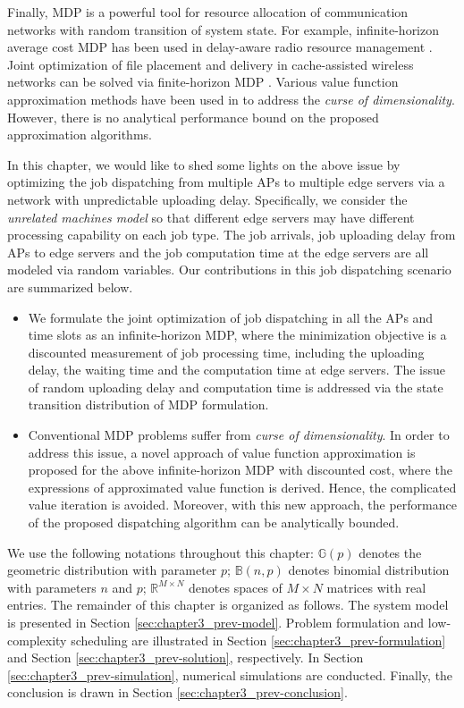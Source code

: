 Finally, MDP is a powerful tool for resource allocation of communication networks with random transition of system state. For example,  
infinite-horizon average cost MDP has been used in delay-aware radio resource management \cite{Ruiwang2011,Cui2012,Ruiwang2013}. Joint optimization of file placement and delivery in cache-assisted wireless networks can be solved via finite-horizon MDP \cite{Lv2018-icc,Lv2018-gc,Lv2019}. Various value function approximation methods have been used in \cite{Ruiwang2011,Cui2012,Ruiwang2013,Lv2018-icc,Lv2018-gc,Lv2019} 
to address the \emph{curse of dimensionality}. However, there is no analytical performance bound on the proposed approximation algorithms.

In this chapter, we would like to shed some lights on the above issue by optimizing the job dispatching from multiple APs to multiple edge servers via a network with unpredictable uploading delay.
Specifically, we consider the \emph{unrelated machines model} so that different edge servers may have different processing capability on each job type. 
The job arrivals, job uploading delay from APs to edge servers and the job computation time at the edge servers are all modeled via random variables.
Our contributions in this job dispatching scenario are summarized below.
\begin{itemize}
    \item We formulate the joint optimization of job dispatching in all the APs and time slots as an infinite-horizon MDP, where the minimization objective is a discounted measurement of job processing time, including the uploading delay, the waiting time and the computation time  at
        edge servers. The issue of random uploading delay and computation time is addressed via the state transition distribution of MDP formulation.
    \item Conventional MDP problems suffer from \emph{curse of dimensionality}.
    In order to address this issue, a novel approach of value function approximation is proposed for the above infinite-horizon MDP with discounted cost, where the expressions of approximated value function is derived. Hence, the complicated value iteration is avoided. Moreover, with this new approach, the performance of the proposed dispatching algorithm can be analytically bounded. 
\end{itemize}

We use the following notations throughout this chapter:
$\mathbb{G}(p)$ denotes the geometric distribution with parameter $p$;
$\mathbb{B}(n,p)$ denotes binomial distribution with parameters $n$ and $p$;
$\mathbb{R}^{M\times N}$ denotes spaces of $M\times N$ matrices with real entries.
The remainder of this chapter is organized as follows.
The system model is presented in Section \ref{sec:chapter3_prev-model}.
Problem formulation and low-complexity scheduling are illustrated in Section \ref{sec:chapter3_prev-formulation} and Section \ref{sec:chapter3_prev-solution}, respectively.
In Section \ref{sec:chapter3_prev-simulation}, numerical simulations are conducted.
Finally, the conclusion is drawn in Section \ref{sec:chapter3_prev-conclusion}.

